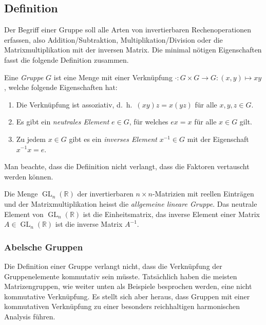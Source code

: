 %
%
%

%
%
\subsection{Definition
\label{buch:gruppen:subsection:definition}}
Der Begriff einer Gruppe soll alle Arten von invertierbaren Rechenoperationen
erfassen, also Addition/Subtraktion, Multiplikation/Division oder
die Matrixmultiplikation mit der inversen Matrix.
Die minimal nötigen Eigenschaften fasst die folgende Definition zusammen.

\begin{definition}
\label{buch:gruppen:definition:gruppe}
Eine {\em Gruppe} $G$ ist eine Menge mit einer Verknüpfung
$\cdot \colon G\times G\to G : (x,y) \mapsto xy $, welche folgende
Eigenschaften hat:
\begin{enumerate}
\item
Die Verknüpfung ist assoziativ, d.~h.~$(xy)z=x(yz)$ für alle
$x,y,z\in G$.
\item
Es gibt ein {\em neutrales Element} $e\in G$, für welches $ex=x$ für alle
$x\in G$ gilt.
%
\item 
Zu jedem $x\in G$ gibt es ein {\em inverses Element} $x^{-1}\in G$ mit der
Eigenschaft $x^{-1}x=e$.
%
\end{enumerate}
\end{definition}

Man beachte, dass die Defiinition nicht verlangt, dass die Faktoren
vertauscht werden können. 

\begin{beispiel}
Die Menge $\operatorname{GL}_n(\mathbb{R})$ der invertierbaren
$n\times n$-Matrizien mit reellen Einträgen und der Matrixmultiplikation
heisst die {\em allgemeine lineare Gruppe}.
%
%
Das neutrale Element von $\operatorname{GL}_n(\mathbb{R})$ ist die
Einheitsmatrix, das inverse Element einer Matrix
$A\in \operatorname{GL}_n(\mathbb{R})$
ist die inverse Matrix $A^{-1}$.
\end{beispiel}

%
%
\subsubsection{Abelsche Gruppen}
Die Definition einer Gruppe verlangt nicht, dass die Verknüpfung der
Gruppenelemente kommutativ sein müsste.
Tatsächlich haben die meisten Matrizengruppen, wie weiter unten als 
Beispiele besprochen werden, eine nicht kommutative Verknüpfung.
Es stellt sich aber heraus, dass Gruppen mit einer kommutativen
Verknüpfung zu einer besonders reichhaltigen harmonischen Analysis
führen.


